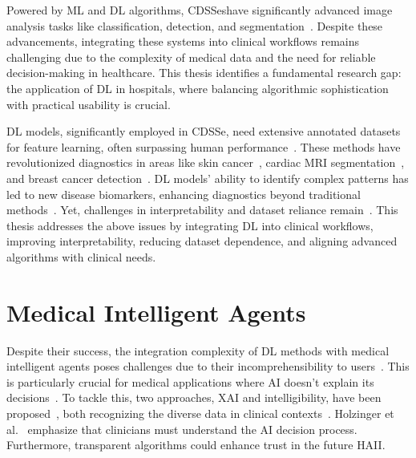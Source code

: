 \textcolor{revised}{Powered by \ac{ML} and \ac{DL} algorithms, \acp{CDSSe}\footnotemark[5] have significantly advanced image analysis tasks like classification, detection, and segmentation~\cite{lecun2015deep, 10.1007/978-3-030-22871-2_67}.
Despite these advancements, integrating these systems into clinical workflows remains challenging due to the complexity of medical data and the need for reliable decision-making in healthcare.
This thesis identifies a fundamental research gap: the application of \ac{DL} in hospitals, where balancing algorithmic sophistication with practical usability is crucial.}



\textcolor{revised}{\ac{DL} models, significantly employed in \ac{CDSSe}, need extensive annotated datasets for feature learning, often surpassing human performance~\cite{McKinney2020}.
These methods have revolutionized diagnostics in areas like skin cancer~\cite{Esteva2017}, cardiac \ac{MRI} segmentation~\cite{medley2019segmenting}, and breast cancer detection~\cite{MAICAS2019101562}.
\ac{DL} models' ability to identify complex patterns has led to new disease biomarkers, enhancing diagnostics beyond traditional methods~\cite{McKinney2020}.
Yet, challenges in interpretability and dataset reliance remain~\cite{8884671}.
This thesis addresses the above issues by integrating \ac{DL} into clinical workflows, improving interpretability, reducing dataset dependence, and aligning advanced algorithms with clinical needs.}

\section{Medical Intelligent Agents}
\label{sec:chap003004}

Despite their success, the integration complexity of \ac{DL} methods with medical intelligent agents poses challenges due to their incomprehensibility to users~\cite{holzinger2019causability}.
This is particularly crucial for medical applications where \ac{AI} doesn't explain its decisions~\cite{shah2019artificial}.
To tackle this, two approaches, \ac{XAI} and intelligibility, have been proposed~\cite{gunning2017explainable}, both recognizing the diverse data in clinical contexts~\cite{Bharadhwaj:2019:ERS:3308557.3308699}.
Holzinger et al.~\cite{holzinger2018current} emphasize that clinicians must understand the \ac{AI} decision process.
Furthermore, transparent algorithms could enhance trust in the future \ac{HAII}\cite{Dominguez:2019:EEA:3301275.3302274, Weisz:2019:BTS:3301275.3302290}.

